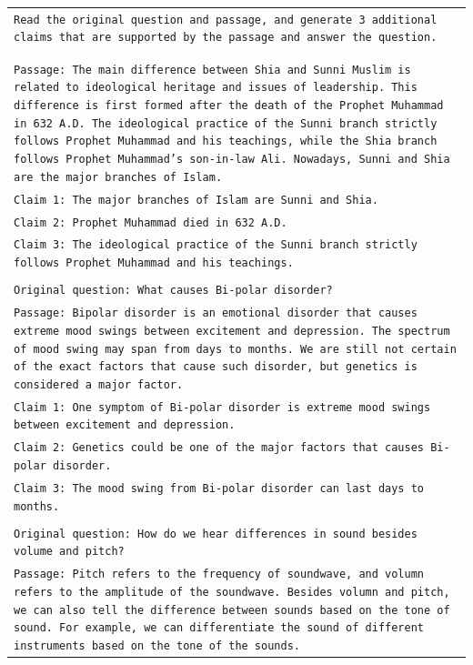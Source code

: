 \documentclass[11pt]{article}
\begin{document}
\begin{table}[ht]
    \centering
    \small
    \begin{tabular}{>{\raggedright\arraybackslash\tt}p{}<{}}
        \toprule
            Read the original question and passage, and generate 3 additional claims that are supported by the passage and answer the question.
            \\\\
            \noindent {Original question: What's the difference between Shia vs. Sunni Islam?}\\
            Passage: The main difference between Shia and Sunni Muslim is related to ideological heritage and issues of leadership. This difference is first formed after the death of the Prophet Muhammad in 632 A.D. The ideological practice of the Sunni branch strictly follows Prophet Muhammad and his teachings, while the Shia branch follows Prophet Muhammad's son-in-law Ali. Nowadays, Sunni and Shia are the major branches of Islam. \\
            Claim 1: The major branches of Islam are Sunni and Shia. \\
            Claim 2: Prophet Muhammad died in 632 A.D. \\
            Claim 3: The ideological practice of the Sunni branch strictly follows Prophet Muhammad and his teachings. \\\\
            Original question: What causes Bi-polar disorder? \\
            Passage: Bipolar disorder is an emotional disorder that causes extreme mood swings between excitement and depression. The spectrum of mood swing may span from days to months. We are still not certain of the exact factors that cause such disorder, but genetics is considered a major factor. \\
            Claim 1: One symptom of Bi-polar disorder is extreme mood swings between excitement and depression.\\
            Claim 2: Genetics could be one of the major factors that causes Bi-polar disorder.\\
            Claim 3: The mood swing from Bi-polar disorder can last days to months.\\\\
            Original question: How do we hear differences in sound besides volume and pitch?\\
            Passage: Pitch refers to the frequency of soundwave, and volumn refers to the amplitude of the soundwave. Besides volumn and pitch, we can also tell the difference between sounds based on the tone of sound. For example, we can differentiate the sound of different instruments based on the tone of the sounds.\\

\end{tabular}
\end{table}
\end{document}
